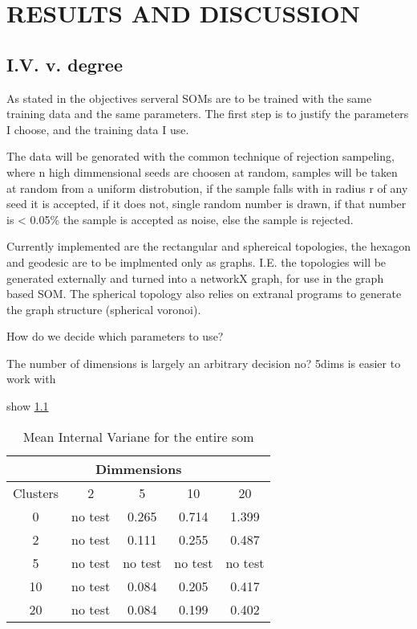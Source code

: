 \chapter{RESULTS AND DISCUSSION}



\section{I.V. v. degree}

As stated in the objectives serveral SOMs are to be trained with the same
training data and the same parameters.  The first step is to justify the
parameters I choose, and the training data I use.

The data will be genorated with the common technique of rejection sampeling,
where n high dimmensional seeds are choosen at random, samples will be taken
at random from a uniform distrobution, if the sample falls with in radius r of
any seed it is accepted, if it does not, single random number is drawn, if that
number is < 0.05\% the sample is accepted as noise, else the sample is rejected.

Currently implemented are the rectangular and sphereical topologies, the hexagon
and geodesic are to be implmented only as graphs.  I.E. the topologies will be
generated externally and turned into a networkX graph, for use in the graph
based SOM. The spherical topology also relies on extranal programs to generate
the graph structure (spherical voronoi).

How do we decide which parameters to use?

The number of dimensions is largely an arbitrary decision no?
5dims is easier to work with

show \ref{ivtable1}


\begin{table}
\caption{Mean Internal Variane for the entire som}
\label{ivtable1}
\begin{tabular}{|c|c|c|c|c|}
\hline
\multicolumn{5}{|c|}{Dimmensions}\\
\hline
Clusters & 2 & 5 & 10 & 20 \\
\hline
\hline
0 & no test & 0.265 & 0.714 & 1.399 \\
\hline
2 & no test & 0.111 & 0.255 & 0.487 \\
\hline
5 & no test & no test & no test & no test \\
\hline
10 & no test & 0.084 & 0.205 & 0.417 \\
\hline
20 & no test & 0.084 & 0.199 & 0.402 \\
\hline
\hline

\end{tabular}
\end{table}
